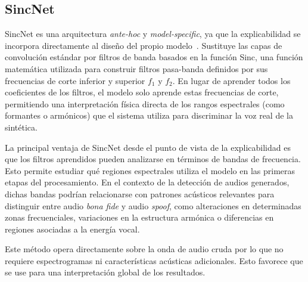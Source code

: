\subsection{SincNet}
\label{subsubsec:eda_snet}
SincNet es una arquitectura \textit{ante-hoc} y \textit{model-specific}, ya que la explicabilidad se incorpora directamente al diseño del propio modelo~\parencite{2018sincnet}. Sustituye las capas de convolución estándar por filtros de banda basados en la función Sinc, una función matemática utilizada para construir filtros pasa-banda definidos por sus frecuencias de corte inferior y superior $f_1$ y $f_2$. En lugar de aprender todos los coeficientes de los filtros, el modelo solo aprende estas frecuencias de corte, permitiendo una interpretación física directa de los rangos espectrales (como formantes o armónicos) que el sistema utiliza para discriminar la voz real de la sintética.

La principal ventaja de SincNet desde el punto de vista de la explicabilidad es que los filtros aprendidos pueden analizarse en términos de bandas de frecuencia. Esto permite estudiar qué regiones espectrales utiliza el modelo en las primeras etapas del procesamiento. En el contexto de la detección de audios generados, dichas bandas podrían relacionarse con patrones acústicos relevantes para distinguir entre audio \textit{bona fide} y audio \textit{spoof}, como alteraciones en determinadas zonas frecuenciales, variaciones en la estructura armónica o diferencias en regiones asociadas a la energía vocal.

Este método opera directamente sobre la onda de audio cruda por lo que no requiere espectrogramas ni características acústicas adicionales. Esto favorece que se use para una interpretación global de los resultados.
